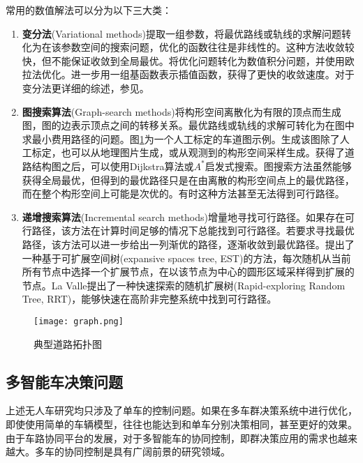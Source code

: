       常用的数值解法可以分为以下三大类：

      \begin{enumerate}[label=(\arabic*)]
      \item \textbf{变分法}(Variational methods)提取一组参数，将最优路线或轨线的求解问题转化为在该参数空间的搜索问题，优化的函数往往是非线性的。这种方法收敛较快，但不能保证收敛到全局最优。\cite{Ziegler2014Making}将优化问题转化为数值积分问题，并使用欧拉法优化。\cite{Darby2011An}进一步用一组基函数表示插值函数，获得了更快的收敛速度。对于变分法更详细的综述，参见\cite{Betts1998Survey}。

      \item \textbf{图搜索算法}(Graph-search methods)将构形空间离散化为有限的顶点而生成图，图的边表示顶点之间的转移关系。最优路线或轨线的求解可转化为在图中求最小费用路径的问题。图\ref{fig:graph}为一个人工标定的车道图示例。生成该图除了人工标定，也可以从地理图片生成\cite{Backer2007Finding,Wang1996Approximation}，或从观测到的构形空间采样生成\cite{Lavalle1999Rapidly,Glassman2010A}。获得了道路结构图之后，可以使用Dijkstra算法\cite{Dijkstra1959A}或$A^*$启发式搜索\cite{Hart2010A}。图搜索方法虽然能够获得全局最优，但得到的最优路径只是在由离散的构形空间点上的最优路径，而在整个构形空间上可能是次优的。有时这种方法甚至无法得到可行路径。

      \item \textbf{递增搜索算法}(Incremental search methods)增量地寻找可行路径。如果存在可行路径，该方法在计算时间足够的情况下总能找到可行路径。若要求寻找最优路径，该方法可以进一步给出一列渐优的路径，逐渐收敛到最优路径。\cite{David1997Path}提出了一种基于可扩展空间树(expansive spaces tree, EST)的方法，每次随机从当前所有节点中选择一个扩展节点，在以该节点为中心的圆形区域采样得到扩展的节点。La Valle\cite{Lavalle1999Rapidly}提出了一种快速探索的随机扩展树(Rapid-exploring Random Tree, RRT)，能够快速在高阶非完整系统中找到可行路径。

      \end{enumerate}

      \begin{figure}[htbp]
      \centering
      \texttt{[image: graph.png]}
      \caption{典型道路拓扑图}
      \label{fig:graph}
      \end{figure}

  \subsection{多智能车决策问题}
    \label{sec:multi}
    上述无人车研究均只涉及了单车的控制问题。如果在多车群决策系统中进行优化，即使使用简单的车辆模型，往往也能达到和单车分别决策相同，甚至更好的效果\cite{Cao2012An}。由于车路协同平台的发展，对于多智能车的协同控制，即群决策应用的需求也越来越大。多车的协同控制是具有广阔前景的研究领域。

